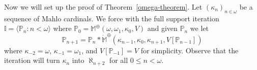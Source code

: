 \documentclass[a4paper]{amsart}
\theoremstyle{definition}
\theoremstyle{remark}
\theoremstyle{plain}
\newtheorem{mylem}[mydef]{Lemma}
\numberwithin{mydef}{section}
\DeclareMathOperator{\Add}{Add}
\DeclareMathOperator{\ICNIA}{\textup{\textsf{ICNIA}}}
\newcommand{\dI}{\mathbb{I}}
\newcommand{\dM}{\mathbb{M}}
\newcommand{\dP}{\mathbb{P}}
\newcommand{\seq}[2]{\langle #1 : #2 \rangle}
\begin{document}
	Now we will set up the proof of Theorem~\autoref{omega-theorem}. Let $(\kappa_n)_{n\in\omega}$ be a sequence of Mahlo cardinals. We force with the full support iteration $\dI = \seq{\dP_n}{n<\omega}$ where $\dP_0 = \dM^\oplus(\omega,\omega_1,\kappa_0,V)$ and given $\dP_n$ we let
	\[
	\dP_{n+1} = \dP_n \ast \dot{\dM}^\oplus(\kappa_{n-1},\kappa_0,\kappa_{n+1},V[\dP_{n-1}])
\]	
where $\kappa_{-2}=\omega$, $\kappa_{-1}=\omega_1$, and $V[\dP_{-1}]=V$ for simplicity. Observe that the iteration will turn $\kappa_n$ into $\aleph_{n+2}$ for all $0 \le n<\omega$.


	

	
	

	
	
	

\end{document}
